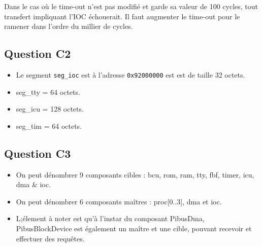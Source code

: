 \documentclass[10pt]{article}
\begin{document}
Dans le cas où le time-out n'est pas modifié et garde sa valeur de 100 cycles,
tout transfert impliquant l'IOC échouerait. Il faut augmenter le time-out pour
le ramener dans l'ordre du millier de cycles.

\subsection{Question C2}
\begin{itemize}
  \item Le segment \texttt{seg\_ioc} est à l'adresse \texttt{0x92000000} est est
  de taille 32 octets.
  \item seg\_tty = 64 octets.
  \item seg\_icu = 128 octets.
  \item seg\_tim = 64 octets.
\end{itemize}

\subsection{Question C3}
\begin{itemize}
  \item On peut dénombrer 9 composants cibles : bcu, rom, ram, tty, fbf, timer,
  icu, dma \& ioc.
  \item On peut dénombrer 6 composants maîtres : proc[0..3], dma et ioc.
  \item L;élement à noter est qu'à l'instar du composant PibusDma,
  PibusBlockDevice est également un maître et une cible, pouvant recevoir et
  effectuer des requêtes.
\end{itemize}

\newpage
\end{document}
